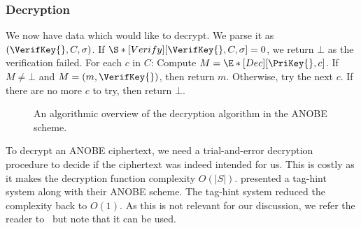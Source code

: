 \subsubsection{Decryption}

We now have data which would like to decrypt.
We parse it as \((\VerifKey{}, C, \sigma)\).
If \(\S*[Verify][\VerifKey{}, C, \sigma ] = 0\), we return \(\bot\) as the 
verification failed.
For each \(c\) in \(C\):
Compute \(M = \E*[Dec][\PriKey{}, c ]\).
If \(M \neq \bot\) and \(M = (m, \VerifKey{})\), then return \(m\).
Otherwise, try the next \(c\).
If there are no more \(c\) to try, then return \(\bot\).

\begin{frame}
  \begin{figure}
    \caption{%
      An algorithmic overview of the decryption algorithm in the \ac{ANOBE} 
      scheme.
    }\label{DecANOBE}
  \end{figure}
\end{frame}

To decrypt an \ac{ANOBE} ciphertext, we need a trial-and-error decryption 
procedure to decide if the ciphertext was indeed intended for us.
This is costly as it makes the decryption function complexity \(O(|S|)\).
\citet{ANOBE} presented a tag-hint system along with their \ac{ANOBE} scheme.
The tag-hint system reduced the complexity back to \(O(1)\).
As this is not relevant for our discussion, we refer the reader to~\cite{ANOBE} 
but note that it can be used.

